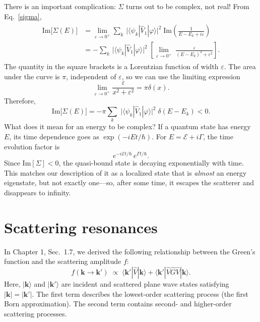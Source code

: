 \documentclass[prx,12pt]{revtex4-2}
\begin{document}
There is an important complication: $\Sigma$ turns out to be complex,
not real!  From Eq.~\eqref{sigma},
\begin{align}
  \begin{aligned}\mathrm{Im}\big[\Sigma(E)\big] &= \lim_{\varepsilon\rightarrow0^+} \sum_k\, \Big| \langle\psi_k| \hat{V}_1|\varphi\rangle\Big|^2 \; \mathrm{Im}\left( \frac{1}{\displaystyle E-E_k+i\varepsilon}\right) \\ &= - \sum_k\, \Big| \langle\psi_k| \hat{V}_1|\varphi\rangle\Big|^2 \; \left[ \lim_{\varepsilon\rightarrow0^+} \; \frac{\varepsilon}{\displaystyle (E-E_k)^2 + \varepsilon^2}\right].\end{aligned}
\end{align}
The quantity in the square brackets is a Lorentzian function of
width $\varepsilon$.  The area under the curve is $\pi$, independent
of $\varepsilon$, so we can use the limiting expression
\begin{equation}
  \lim_{\varepsilon\rightarrow 0^+} \frac{\varepsilon}{x^2+\varepsilon^2} = \pi\delta(x).
\end{equation}
Therefore,
\begin{equation}
  \mathrm{Im}\big[\Sigma(E)\big]
  = - \pi \sum_k \; \big| \langle\psi_k| \hat{V}_1|\varphi\rangle\big|^2
  \; \delta(E-E_k) < 0.
  \label{fermigr1}
\end{equation}
What does it mean for an energy to be complex?  If a quantum state has
energy $E$, its time dependence goes as $\exp(-iE t/\hbar)$.  For $E =
\mathcal{E} + i \Gamma$, the time evolution factor is
\begin{equation*}
  e^{-i\mathcal{E} t/\hbar} \, e^{\Gamma t/\hbar}.
\end{equation*}
Since $\mathrm{Im}[\Sigma] < 0$, the quasi-bound state is decaying
exponentially with time.  This matches our description of it as a
localized state that is \textit{almost} an energy eigenstate, but not
exactly one---so, after some time, it escapes the scatterer and
disappears to infinity.

\section{Scattering resonances}
\label{sec:scattering_resonances}

In Chapter 1, Sec.~1.7, we derived the following relationship between
the Green's function and the scattering amplitude $f$:
\begin{equation}
  f(\mathbf{k}\rightarrow\mathbf{k}') \;\propto\; \langle \mathbf{k}'|\hat{V}|\mathbf{k}\rangle + \langle \mathbf{k}'|\hat{V}\hat{G}\hat{V}|\mathbf{k}\rangle.
\end{equation}
Here, $|\mathbf{k}\rangle$ and $|\mathbf{k}'\rangle$ are incident and
scattered plane wave states satisfying $|\mathbf{k}|=|\mathbf{k}'|$.
The first term describes the lowest-order scattering process (the
first Born approximation).  The second term contains second- and
higher-order scattering processes.
\end{document}
